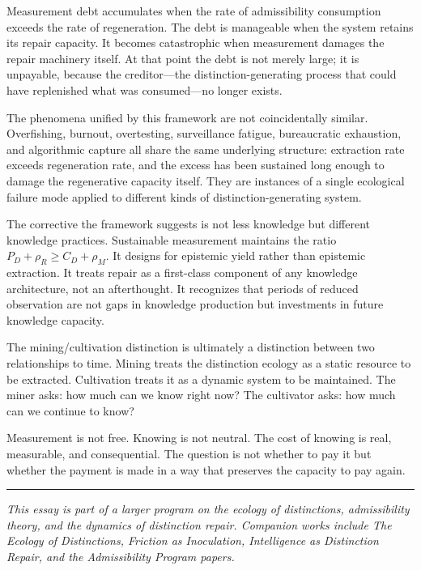 \documentclass[12pt, a4paper]{article}
\theoremstyle{flyxion}
\newcommand{\rhoM}{\rho_{M}}
\newcommand{\rhoR}{\rho_{R}}
\begin{document}
Measurement debt accumulates when the rate of admissibility consumption exceeds the rate of regeneration. The debt is manageable when the system retains its repair capacity. It becomes catastrophic when measurement damages the repair machinery itself. At that point the debt is not merely large; it is unpayable, because the creditor---the distinction-generating process that could have replenished what was consumed---no longer exists.

The phenomena unified by this framework are not coincidentally similar. Overfishing, burnout, overtesting, surveillance fatigue, bureaucratic exhaustion, and algorithmic capture all share the same underlying structure: extraction rate exceeds regeneration rate, and the excess has been sustained long enough to damage the regenerative capacity itself. They are instances of a single ecological failure mode applied to different kinds of distinction-generating system.

The corrective the framework suggests is not less knowledge but different knowledge practices. Sustainable measurement maintains the ratio $P_D + \rhoR \geq C_D + \rhoM$. It designs for epistemic yield rather than epistemic extraction. It treats repair as a first-class component of any knowledge architecture, not an afterthought. It recognizes that periods of reduced observation are not gaps in knowledge production but investments in future knowledge capacity.

The mining/cultivation distinction is ultimately a distinction between two relationships to time. Mining treats the distinction ecology as a static resource to be extracted. Cultivation treats it as a dynamic system to be maintained. The miner asks: how much can we know right now? The cultivator asks: how much can we continue to know?

Measurement is not free. Knowing is not neutral. The cost of knowing is real, measurable, and consequential. The question is not whether to pay it but whether the payment is made in a way that preserves the capacity to pay again.

\bigskip

\noindent\rule{0.4\textwidth}{0.4pt}

\bigskip

\noindent\textit{This essay is part of a larger program on the ecology of distinctions, admissibility theory, and the dynamics of distinction repair. Companion works include \textit{The Ecology of Distinctions}, \textit{Friction as Inoculation}, \textit{Intelligence as Distinction Repair}, and the \textit{Admissibility Program} papers.}
\end{document}
